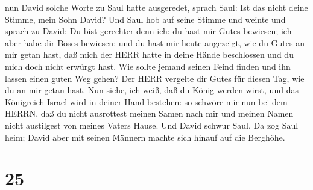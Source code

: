 nun David solche Worte zu Saul hatte ausgeredet, sprach Saul: Ist das
nicht deine Stimme, mein Sohn David? Und Saul hob auf seine Stimme und
weinte  und sprach zu David: Du bist gerechter denn ich: du
hast mir Gutes bewiesen; ich aber habe dir Böses bewiesen; 
und du hast mir heute angezeigt, wie du Gutes an mir getan hast, daß
mich der HERR hatte in deine Hände beschlossen und du mich doch nicht
erwürgt hast.  Wie sollte jemand seinen Feind finden und
ihn lassen einen guten Weg gehen? Der HERR vergelte dir Gutes für diesen
Tag, wie du an mir getan hast.  Nun siehe, ich weiß, daß du
König werden wirst, und das Königreich Israel wird in deiner Hand
bestehen:  so schwöre mir nun bei dem HERRN, daß du nicht
ausrottest meinen Samen nach mir und meinen Namen nicht austilgest von
meines Vaters Hause.  Und David schwur Saul. Da zog Saul
heim; David aber mit seinen Männern machte sich hinauf auf die Berghöhe.

\hypertarget{section-24}{%
\section{25}\label{section-24}}

